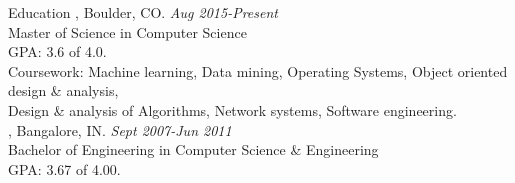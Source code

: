 
\begin{category}{Education}
, Boulder, CO. \hfill \textit{Aug 2015-Present}
\\ \hfill Master of Science in Computer Science\\
GPA: 3.6 of 4.0.\\
Coursework: Machine learning, Data mining, Operating Systems, Object oriented design \& analysis,\\ Design \& analysis of Algorithms, Network systems, Software engineering.\\
, Bangalore, IN. \hfill \textit{Sept 2007-Jun 2011}
\\ \hfill Bachelor of Engineering in Computer Science \& Engineering\\
GPA: 3.67 of 4.00.
\end{category}
